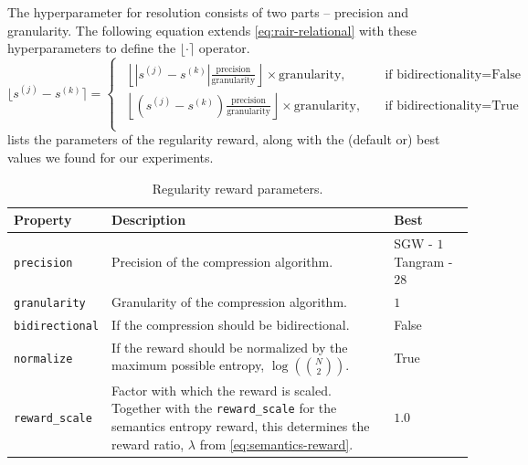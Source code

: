 The hyperparameter for resolution consists of two parts -- precision and granularity.
The following equation extends \eqref{eq:rair-relational} with these hyperparameters to define the \(\lfloor \cdot \rceil\) operator.
\begin{equation}
    \lfloor s^{(j)} - s^{(k)} \rceil = \begin{cases}\begin{aligned}
        \left\lfloor \left| s^{(j)} - s^{(k)} \right| \frac{\text{precision}}{\text{granularity}} \right\rfloor \times \text{granularity},\quad&\text{if bidirectionality} = \text{False}\\
        \left\lfloor \left( s^{(j)} - s^{(k)} \right) \frac{\text{precision}}{\text{granularity}} \right\rfloor \times \text{granularity},\quad&\text{if bidirectionality} = \text{True}\\
    \end{aligned}\end{cases}
    \label{eq:rair-relational-extended}
\end{equation}
 lists the parameters of the regularity reward, along with the (default or) best values we found for our experiments.
\begin{table}[H]
    \centering
    \caption{Regularity reward parameters.}
    \begin{tabularx}{\textwidth}{C{3.9cm} L C{2.1cm}}
        \hline
        Property & Description & Best\\
        \hline
        \texttt{precision} & Precision of the compression algorithm. & SGW - \(1\) Tangram - \(28\)\\
        \texttt{granularity} & Granularity of the compression algorithm. & \(1\)\\
        \texttt{bidirectional} & If the compression should be bidirectional. & False\\
        \texttt{normalize} & If the reward should be normalized by the maximum possible entropy, \(\log\left(\binom{N}{2}\right)\). & True\\
        \texttt{reward\_scale} & Factor with which the reward is scaled. Together with the \texttt{reward\_scale} for the semantics entropy reward, this determines the reward ratio, \(\lambda\) from \eqref{eq:semantics-reward}. & \(1.0\)\\
        \hline
    \end{tabularx}
    \label{tab:regularity-reward-params}
\end{table}

